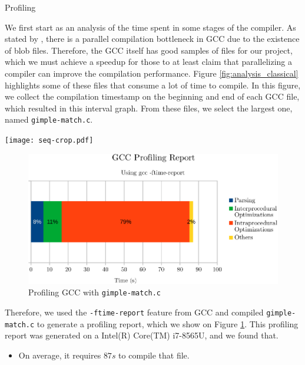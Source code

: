 \begin{section}{Profiling}\label{sec:profile}

We first start as an analysis of the time spent in some stages of the compiler.
As stated by \cite{PR84402}, there is a parallel compilation bottleneck in GCC
due to the existence of blob files. Therefore, the GCC itself has good samples
of files for our project, which we must achieve a speedup for those to at least
claim that parallelizing a compiler can improve the compilation performance.
Figure \ref{fig:analysis_classical} highlights some of these files that consume
a lot of time to compile. In this figure, we collect the compilation
timestamp on the beginning and end of each GCC file, which resulted in this
interval graph. From these files, we select the largest one, named
\texttt{gimple-match.c}.

\begin{landscape}
 \vspace*{-2cm}%
 \noindent%
 \hspace*{-2cm}%
    \texttt{[image: seq-crop.pdf]}
    \label{fig:analysis_classical}
\end{landscape}


\begin{figure}
\centering
	 \includegraphics[scale=1.0]{figuras/profiling-crop.pdf}
	  \caption{Profiling GCC with \texttt{gimple-match.c}}
	  \label{fig:gcc_profiling}
\end{figure}

Therefore, we used the \texttt{-ftime-report} feature from GCC and compiled
\texttt{gimple-match.c} to generate a profiling report, which we show on Figure
\ref{fig:gcc_profiling}. This profiling report was generated on a
Intel(R) Core(TM) i7-8565U, and we found that.
\begin{itemize}
    \item On average, it requires $87s$ to compile that file.


\end{itemize}
\end{section}
